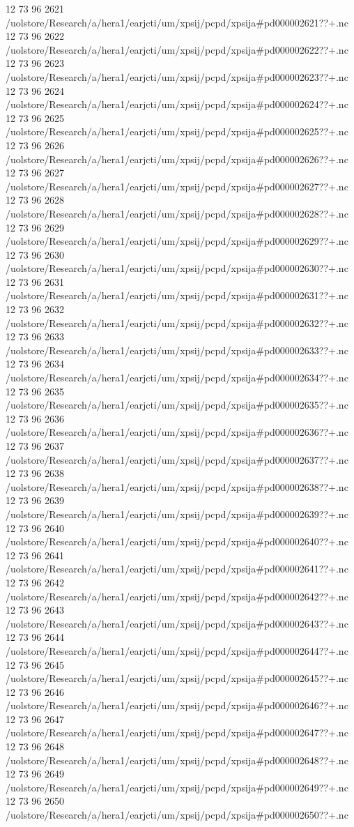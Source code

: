 12 73 96
2621
/uolstore/Research/a/hera1/earjcti/um/xpsij/pcpd/xpsija#pd000002621??+.nc
12 73 96
2622
/uolstore/Research/a/hera1/earjcti/um/xpsij/pcpd/xpsija#pd000002622??+.nc
12 73 96
2623
/uolstore/Research/a/hera1/earjcti/um/xpsij/pcpd/xpsija#pd000002623??+.nc
12 73 96
2624
/uolstore/Research/a/hera1/earjcti/um/xpsij/pcpd/xpsija#pd000002624??+.nc
12 73 96
2625
/uolstore/Research/a/hera1/earjcti/um/xpsij/pcpd/xpsija#pd000002625??+.nc
12 73 96
2626
/uolstore/Research/a/hera1/earjcti/um/xpsij/pcpd/xpsija#pd000002626??+.nc
12 73 96
2627
/uolstore/Research/a/hera1/earjcti/um/xpsij/pcpd/xpsija#pd000002627??+.nc
12 73 96
2628
/uolstore/Research/a/hera1/earjcti/um/xpsij/pcpd/xpsija#pd000002628??+.nc
12 73 96
2629
/uolstore/Research/a/hera1/earjcti/um/xpsij/pcpd/xpsija#pd000002629??+.nc
12 73 96
2630
/uolstore/Research/a/hera1/earjcti/um/xpsij/pcpd/xpsija#pd000002630??+.nc
12 73 96
2631
/uolstore/Research/a/hera1/earjcti/um/xpsij/pcpd/xpsija#pd000002631??+.nc
12 73 96
2632
/uolstore/Research/a/hera1/earjcti/um/xpsij/pcpd/xpsija#pd000002632??+.nc
12 73 96
2633
/uolstore/Research/a/hera1/earjcti/um/xpsij/pcpd/xpsija#pd000002633??+.nc
12 73 96
2634
/uolstore/Research/a/hera1/earjcti/um/xpsij/pcpd/xpsija#pd000002634??+.nc
12 73 96
2635
/uolstore/Research/a/hera1/earjcti/um/xpsij/pcpd/xpsija#pd000002635??+.nc
12 73 96
2636
/uolstore/Research/a/hera1/earjcti/um/xpsij/pcpd/xpsija#pd000002636??+.nc
12 73 96
2637
/uolstore/Research/a/hera1/earjcti/um/xpsij/pcpd/xpsija#pd000002637??+.nc
12 73 96
2638
/uolstore/Research/a/hera1/earjcti/um/xpsij/pcpd/xpsija#pd000002638??+.nc
12 73 96
2639
/uolstore/Research/a/hera1/earjcti/um/xpsij/pcpd/xpsija#pd000002639??+.nc
12 73 96
2640
/uolstore/Research/a/hera1/earjcti/um/xpsij/pcpd/xpsija#pd000002640??+.nc
12 73 96
2641
/uolstore/Research/a/hera1/earjcti/um/xpsij/pcpd/xpsija#pd000002641??+.nc
12 73 96
2642
/uolstore/Research/a/hera1/earjcti/um/xpsij/pcpd/xpsija#pd000002642??+.nc
12 73 96
2643
/uolstore/Research/a/hera1/earjcti/um/xpsij/pcpd/xpsija#pd000002643??+.nc
12 73 96
2644
/uolstore/Research/a/hera1/earjcti/um/xpsij/pcpd/xpsija#pd000002644??+.nc
12 73 96
2645
/uolstore/Research/a/hera1/earjcti/um/xpsij/pcpd/xpsija#pd000002645??+.nc
12 73 96
2646
/uolstore/Research/a/hera1/earjcti/um/xpsij/pcpd/xpsija#pd000002646??+.nc
12 73 96
2647
/uolstore/Research/a/hera1/earjcti/um/xpsij/pcpd/xpsija#pd000002647??+.nc
12 73 96
2648
/uolstore/Research/a/hera1/earjcti/um/xpsij/pcpd/xpsija#pd000002648??+.nc
12 73 96
2649
/uolstore/Research/a/hera1/earjcti/um/xpsij/pcpd/xpsija#pd000002649??+.nc
12 73 96
2650
/uolstore/Research/a/hera1/earjcti/um/xpsij/pcpd/xpsija#pd000002650??+.nc
